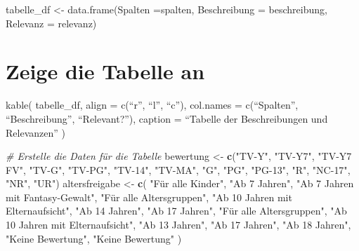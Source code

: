 \documentclass[
]{article}
\newenvironment{Shaded}{\begin{snugshade}}{\end{snugshade}}
\newcommand{\CommentTok}[1]{\textcolor[rgb]{0.56,0.35,0.01}{\textit{#1}}}
\newcommand{\FunctionTok}[1]{\textcolor[rgb]{0.13,0.29,0.53}{\textbf{#1}}}
\newcommand{\NormalTok}[1]{#1}
\newcommand{\OtherTok}[1]{\textcolor[rgb]{0.56,0.35,0.01}{#1}}
\newcommand{\StringTok}[1]{\textcolor[rgb]{0.31,0.60,0.02}{#1}}
\begin{document}
tabelle\_df \textless- data.frame(Spalten =spalten, Beschreibung =
beschreibung, Relevanz = relevanz)

\section{Zeige die Tabelle an}\label{zeige-die-tabelle-an}

kable( tabelle\_df, align = c(``r'', ``l'', ``c''), col.names =
c(``Spalten'', ``Beschreibung'', ``Relevant?''), caption = ``Tabelle der
Beschreibungen und Relevanzen'' )

\begin{Shaded}
\begin{Highlighting}[]
\CommentTok{\# Erstelle die Daten für die Tabelle}
\NormalTok{bewertung }\OtherTok{\textless{}{-}} \FunctionTok{c}\NormalTok{(}\StringTok{"TV{-}Y"}\NormalTok{, }\StringTok{"TV{-}Y7"}\NormalTok{, }\StringTok{"TV{-}Y7 FV"}\NormalTok{, }\StringTok{"TV{-}G"}\NormalTok{, }\StringTok{"TV{-}PG"}\NormalTok{, }\StringTok{"TV{-}14"}\NormalTok{, }\StringTok{"TV{-}MA"}\NormalTok{, }\StringTok{"G"}\NormalTok{, }\StringTok{"PG"}\NormalTok{, }\StringTok{"PG{-}13"}\NormalTok{, }\StringTok{"R"}\NormalTok{, }\StringTok{"NC{-}17"}\NormalTok{, }\StringTok{"NR"}\NormalTok{, }\StringTok{"UR"}\NormalTok{)}
\NormalTok{altersfreigabe }\OtherTok{\textless{}{-}} \FunctionTok{c}\NormalTok{(}
  \StringTok{"Für alle Kinder"}\NormalTok{, }\StringTok{"Ab 7 Jahren"}\NormalTok{, }\StringTok{"Ab 7 Jahren mit Fantasy{-}Gewalt"}\NormalTok{, }\StringTok{"Für alle Altersgruppen"}\NormalTok{, }
  \StringTok{"Ab 10 Jahren mit Elternaufsicht"}\NormalTok{, }\StringTok{"Ab 14 Jahren"}\NormalTok{, }\StringTok{"Ab 17 Jahren"}\NormalTok{, }\StringTok{"Für alle Altersgruppen"}\NormalTok{, }
  \StringTok{"Ab 10 Jahren mit Elternaufsicht"}\NormalTok{, }\StringTok{"Ab 13 Jahren"}\NormalTok{, }\StringTok{"Ab 17 Jahren"}\NormalTok{, }\StringTok{"Ab 18 Jahren"}\NormalTok{, }\StringTok{"Keine Bewertung"}\NormalTok{, }\StringTok{"Keine Bewertung"}
\NormalTok{)}


\end{Highlighting}
\end{Shaded}
\end{document}
